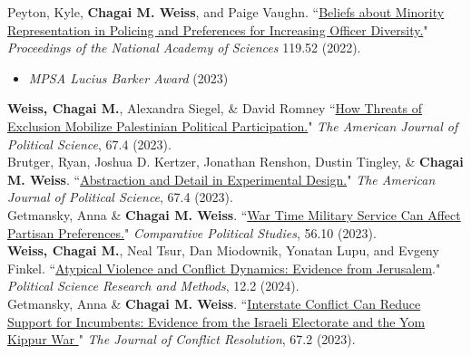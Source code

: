 \documentclass[11pt]{article}
\begin{document}
Peyton, Kyle, \textbf{Chagai M. Weiss}, and Paige Vaughn. ``\href{https://www.pnas.org/doi/10.1073/pnas.2213986119}{Beliefs about Minority Representation in Policing and Preferences for Increasing Officer Diversity.}" \emph{Proceedings of the National Academy of Sciences} 119.52 (2022).
 \begin{itemize}[label=$\star$]
 \item \emph{MPSA Lucius Barker Award} (2023)
\end{itemize}

\textbf{Weiss, Chagai M.}, Alexandra Siegel, \& David Romney ``\href{https://onlinelibrary.wiley.com/doi/full/10.1111/ajps.12718}{How Threats of Exclusion Mobilize Palestinian Political Participation.}" \emph{The American Journal of Political Science}, 67.4 (2023).\\

Brutger, Ryan, Joshua D. Kertzer, Jonathan Renshon, Dustin Tingley, \& \textbf{Chagai M. Weiss}. ``\href{https://onlinelibrary.wiley.com/doi/full/10.1111/ajps.12710}{Abstraction and Detail in Experimental Design.}" \emph{The American Journal of Political Science}, 67.4 (2023).\\

Getmansky, Anna \& \textbf{Chagai M. Weiss}. ``\href{https://journals.sagepub.com/doi/10.1177/00104140221141837}{War Time Military Service Can Affect Partisan Preferences.}" \emph{Comparative Political Studies}, 56.10 (2023).\\

\textbf{Weiss, Chagai M.}, Neal Tsur, Dan Miodownik, Yonatan Lupu, and Evgeny Finkel. ``\href{https://www.cambridge.org/core/journals/political-science-research-and-methods/article/atypical-violence-and-conflict-dynamics-evidence-from-jerusalem/689731DDDA2C0B9C818911C86B472460}{Atypical Violence and Conflict Dynamics: Evidence from Jerusalem}." \emph{Political Science Research and Methods}, 12.2 (2024).\\


Getmansky, Anna \& \textbf{Chagai M. Weiss}. ``\href{https://journals.sagepub.com/doi/10.1177/00220027221114086}{Interstate Conflict Can Reduce Support for Incumbents: Evidence from the Israeli Electorate and the Yom Kippur War
}"  \emph{The Journal of Conflict Resolution}, 67.2 (2023).\\
\end{document}
